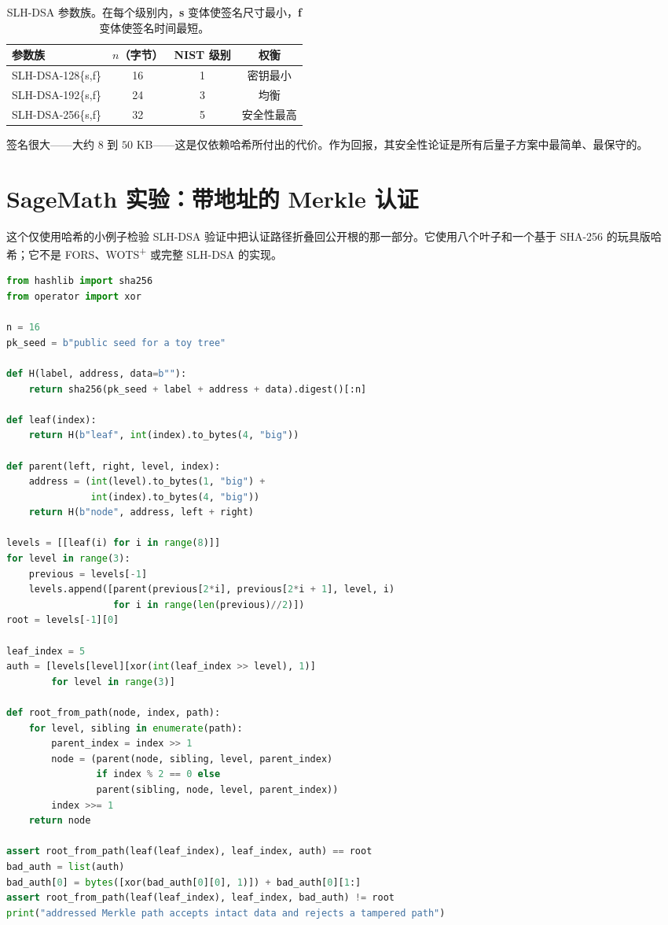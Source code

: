 \begin{table}[H]
\centering
\begin{tabular}{lccc}
\toprule
参数族 & $n$（字节） & NIST 级别 & 权衡 \\
\midrule
SLH-DSA-128\{s,f\} & 16 & 1 & 密钥最小 \\
SLH-DSA-192\{s,f\} & 24 & 3 & 均衡 \\
SLH-DSA-256\{s,f\} & 32 & 5 & 安全性最高 \\
\bottomrule
\end{tabular}
\caption{SLH-DSA 参数族。在每个级别内，\textbf{s} 变体使签名尺寸最小，\textbf{f} 变体使签名时间最短。}
\end{table}

签名很大——大约 $8$ 到 $50$ KB——这是仅依赖哈希所付出的代价。作为回报，其安全性论证是所有后量子方案中最简单、最保守的。

\section{SageMath 实验：带地址的 Merkle 认证}

这个仅使用哈希的小例子检验 SLH-DSA 验证中把认证路径折叠回公开根的那一部分。它使用八个叶子和一个基于 SHA-256 的玩具版哈希；它不是 FORS、WOTS\textsuperscript{+} 或完整 SLH-DSA 的实现。

\begin{lstlisting}[language=Python]
from hashlib import sha256
from operator import xor

n = 16
pk_seed = b"public seed for a toy tree"

def H(label, address, data=b""):
    return sha256(pk_seed + label + address + data).digest()[:n]

def leaf(index):
    return H(b"leaf", int(index).to_bytes(4, "big"))

def parent(left, right, level, index):
    address = (int(level).to_bytes(1, "big") +
               int(index).to_bytes(4, "big"))
    return H(b"node", address, left + right)

levels = [[leaf(i) for i in range(8)]]
for level in range(3):
    previous = levels[-1]
    levels.append([parent(previous[2*i], previous[2*i + 1], level, i)
                   for i in range(len(previous)//2)])
root = levels[-1][0]

leaf_index = 5
auth = [levels[level][xor(int(leaf_index >> level), 1)]
        for level in range(3)]

def root_from_path(node, index, path):
    for level, sibling in enumerate(path):
        parent_index = index >> 1
        node = (parent(node, sibling, level, parent_index)
                if index % 2 == 0 else
                parent(sibling, node, level, parent_index))
        index >>= 1
    return node

assert root_from_path(leaf(leaf_index), leaf_index, auth) == root
bad_auth = list(auth)
bad_auth[0] = bytes([xor(bad_auth[0][0], 1)]) + bad_auth[0][1:]
assert root_from_path(leaf(leaf_index), leaf_index, bad_auth) != root
print("addressed Merkle path accepts intact data and rejects a tampered path")
\end{lstlisting}

